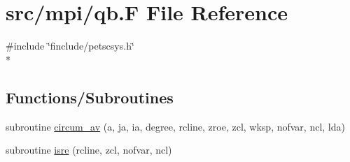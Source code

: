 \hypertarget{mpi_2qb_8_f}{\section{src/mpi/qb.F File Reference}
\label{mpi_2qb_8_f}
}
{\ttfamily \#include \char`\"{}finclude/petscsys.\-h\char`\"{}}\\*
\subsection*{Functions/\-Subroutines}
\begin{DoxyCompactItemize}
\item 
subroutine \hyperlink{mpi_2qb_8_f_a3ba42378b5c52e8619b10dbc327ea00b}{circum\-\_\-av} (a, ja, ia, degree, rcline, zroe, zcl, wksp, nofvar, ncl, lda)
\item 
subroutine \hyperlink{mpi_2qb_8_f_a059e95edfb6b00db6006003d21d95a56}{isre} (rcline, zcl, nofvar, ncl)
\end{DoxyCompactItemize}


